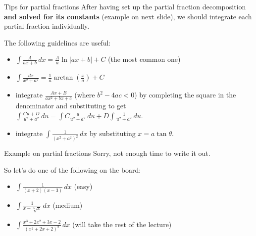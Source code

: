 \begin{frame}{Tips for partial fractions}
    After having set up the partial fraction decomposition \textbf{and solved for its constants} (example on next slide), we should integrate each partial fraction individually.

    The following guidelines are useful:
    \begin{itemize}
        \pause\item $\int \frac{A}{ax+b}\,dx=\frac A a \ln|ax+b|+C$ (the most common one)
        \pause\item $\int \frac{dx}{x^2+a^2}=\frac1a\arctan(\frac xa)+C$
        \pause\item integrate $\frac{Ax+B}{ax^2+bx+c}$ (where $b^2-4ac<0$) by completing the square in the denominator and substituting to get $\int \frac{Cu+D}{u^2+a^2}\,du=\int C\frac{u}{u^2+a^2}\,du+D\int \frac{1}{u^2+a^2}\,du$.
        \pause\item integrate $\int \frac{1}{(x^2+a^2)^2}\,dx$ by substituting $x=a\tan\theta$.
    \end{itemize}
\end{frame}

\begin{frame}{Example on partial fractions}
    Sorry, not enough time to write it out.

    \pause So let's do one of the following on the board:
    \begin{itemize}
        \item $\int \frac{1}{(x+2)(x-3)}\,dx$ (easy)
        \item $\int\frac{1}{x-\sqrt[5]x}\,dx$ (medium)
        \item $\int\frac{x^3+2x^2+3x-2}{(x^2+2x+2)^2}\,dx$ (will take the rest of the lecture)
    \end{itemize}
\end{frame}


